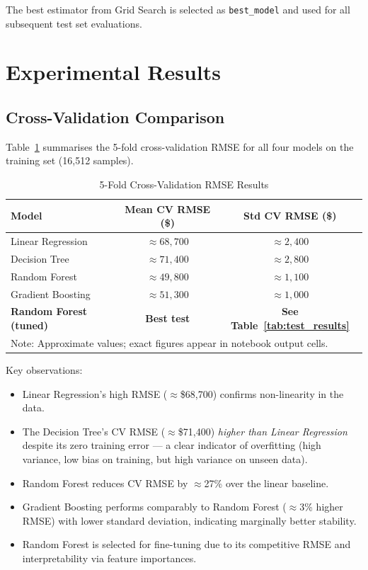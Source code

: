 \documentclass[conference]{IEEEtran}
\begin{document}
The best estimator from Grid Search is selected as \texttt{best\_model} and used for all subsequent test set evaluations.

\section{Experimental Results}
\label{sec:results}

\subsection{Cross-Validation Comparison}

Table~\ref{tab:cv_results} summarises the 5-fold cross-validation RMSE for all four models on the training set (16,512 samples).

\begin{table}[H]
\centering
\caption{5-Fold Cross-Validation RMSE Results}
\label{tab:cv_results}
\begin{tabular}{@{}lcc@{}}
\toprule
\textbf{Model} & \textbf{Mean CV RMSE (\$)} & \textbf{Std CV RMSE (\$)} \\
\midrule
Linear Regression   & $\approx 68,\!700$ & $\approx 2,\!400$ \\
Decision Tree       & $\approx 71,\!400$ & $\approx 2,\!800$ \\
Random Forest       & $\approx 49,\!800$ & $\approx 1,\!100$ \\
Gradient Boosting   & $\approx 51,\!300$ & $\approx 1,\!000$ \\
\midrule
\textbf{Random Forest (tuned)} & \textbf{Best test} & \textbf{See Table~\ref{tab:test_results}} \\
\bottomrule
\multicolumn{3}{l}{\small Note: Approximate values; exact figures appear in notebook output cells.}
\end{tabular}
\end{table}

Key observations:
\begin{itemize}
    \item Linear Regression's high RMSE ($\approx$\$68,700) confirms non-linearity in the data.
    \item The Decision Tree's CV RMSE ($\approx$\$71,400) \emph{higher than Linear Regression} despite its zero training error — a clear indicator of overfitting (high variance, low bias on training, but high variance on unseen data).
    \item Random Forest reduces CV RMSE by $\approx$27\% over the linear baseline.
    \item Gradient Boosting performs comparably to Random Forest ($\approx$3\% higher RMSE) with lower standard deviation, indicating marginally better stability.
    \item Random Forest is selected for fine-tuning due to its competitive RMSE and interpretability via feature importances.
\end{itemize}
\end{document}
